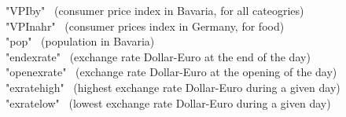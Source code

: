 \documentclass[a4paper, 11pt]{article}
\begin{document}
"VPIby" \ (consumer price index in Bavaria, for all cateogries) \\
"VPInahr" \ (consumer prices index in Germany, for food) \\
"pop"  \ (population in Bavaria) \\
"endexrate" \ (exchange rate Dollar-Euro at the end of the day) \\
"openexrate" \ (exchange rate Dollar-Euro at the opening of the day) \\
"exratehigh" \ (highest exchange rate Dollar-Euro during a given day) \\
"exratelow" \ (lowest exchange rate Dollar-Euro during a given day) \\




\end{document}
